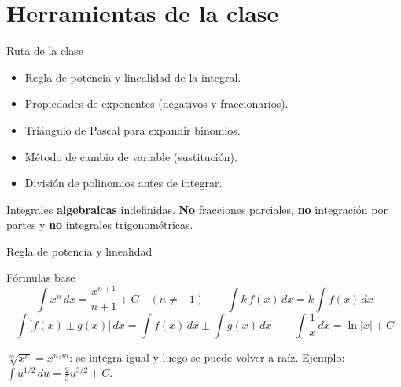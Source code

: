 \documentclass[aspectratio=169]{beamer}
\newcommand{\dx}{\,dx}
\newcommand{\du}{\,du}
\begin{document}
\begin{frame}[plain]
  \titlepage
\end{frame}

\section{Herramientas de la clase}

\begin{frame}{Ruta de la clase}
  \begin{mwpasos}
    \begin{itemize}
      \item Regla de potencia y linealidad de la integral.
      \item Propiedades de exponentes (negativos y fraccionarios).
      \item Triángulo de Pascal para expandir binomios.
      \item Método de cambio de variable (sustitución).
      \item División de polinomios antes de integrar.
    \end{itemize}
  \end{mwpasos}
  \vspace{2pt}
  \begin{mwextra}[Alcance]
    Integrales \textbf{algebraicas} indefinidas. \textbf{No} fracciones parciales,
    \textbf{no} integración por partes y \textbf{no} integrales trigonométricas.
  \end{mwextra}
\end{frame}

\begin{frame}{Regla de potencia y linealidad}
  \begin{block}{Fórmulas base}
    \[
      \int x^{n}\dx = \frac{x^{n+1}}{n+1}+C \quad (n\neq -1)
      \qquad
      \int k\,f(x)\dx = k\int f(x)\dx
    \]
    \[
      \int \bigl[f(x)\pm g(x)\bigr]\dx = \int f(x)\dx \pm \int g(x)\dx
      \qquad
      \int \frac{1}{x}\dx = \ln|x|+C
    \]
  \end{block}
  \vspace{2pt}
  \begin{mwextra}
    $\sqrt[m]{x^{n}} = x^{n/m}$: se integra igual y luego se puede volver a raíz.
    Ejemplo: $\displaystyle\int u^{1/2}\du = \frac{2}{3}u^{3/2}+C$.
  \end{mwextra}
\end{frame}
\end{document}
